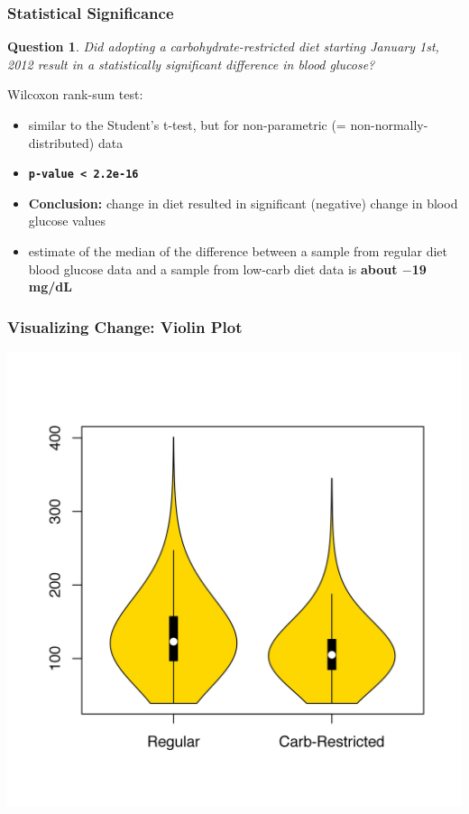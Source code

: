 \documentclass{beamer}
\newtheorem{question}{Question}
\begin{document}
\begin{frame}
  \frametitle{Statistical Significance}

  \begin{question}
     Did adopting a carbohydrate-restricted diet starting January 1st, 2012 result in a statistically significant difference in
     blood glucose?
  \end{question}
  \pause
  Wilcoxon rank-sum test:
  \begin{itemize}
  \pause
  \item similar to the Student's t-test, but for non-parametric (= non-normally-distributed) data
  \pause
  \item \textbf{\texttt{p-value < 2.2e-16}}
  \pause
  \item \textbf{Conclusion:} change in diet resulted in significant (negative) change in blood glucose values
  \pause
  \item estimate of the median of the difference between a sample from regular diet blood glucose data and a sample from low-carb
    diet data is \textbf{about $-$19 mg/dL}
  \end{itemize}

\end{frame}

\begin{frame}
  \frametitle{Visualizing Change: Violin Plot}
  
  \begin{center}
    \includegraphics[height=0.95\textheight]{dexcom_violin.jpg}
  \end{center}

\end{frame}
\end{document}
